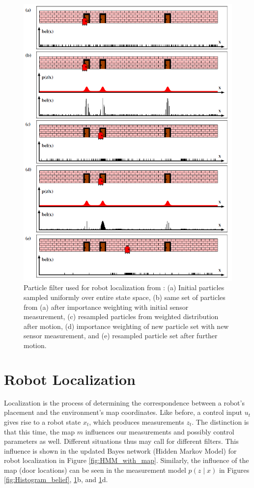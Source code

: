 \documentclass[twoside]{article}
\begin{document}
\begin{figure}[p]
\centering
\includegraphics[width=0.88\linewidth]{particle_localization.png}
\caption{Particle filter used for robot localization from \cite{thrun2005probabilistic}: (a) Initial particles sampled uniformly over entire state space, (b) same set of particles from (a) after importance weighting with initial sensor measurement, (c) resampled particles from weighted distribution after motion, (d) importance weighting of new particle set with new sensor measurement, and (e) resampled particle set after further motion.}
\label{fig:Particle_filter}
\end{figure}

\section{Robot Localization}
Localization is the process of determining the correspondence between a robot's placement and the environment's map coordinates. Like before, a control input $u_t$ gives rise to a robot state $x_t$, which produces measurements $z_t$. The distinction is that this time, the map $m$ influences our measurements and possibly control parameters as well. Different situations thus may call for different filters. This influence is shown in the updated Bayes network (Hidden Markov Model) for robot localization in Figure \ref{fig:HMM_with_map}. Similarly, the influence of the map (door locations) can be seen in the measurement model $p(z \mid x)$ in Figures \ref{fig:Histogram_belief}, \ref{fig:Particle_filter}b, and \ref{fig:Particle_filter}d.
\end{document}

